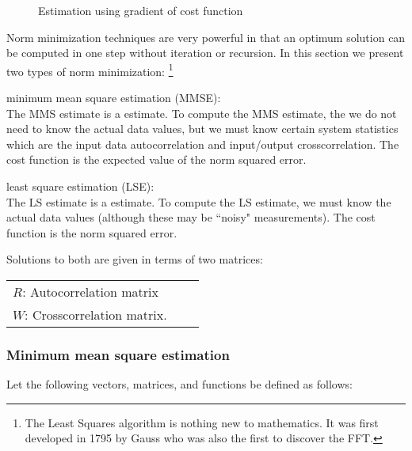 {\begin{figure}[ht]
\begin{center}
\begin{fsK}
\begin{picture}
\end{picture}
\end{fsK}
\end{center}
\caption{
   Estimation using gradient of cost function
   \label{fig:est-grad}
   }
\end{figure}




Norm minimization techniques are very powerful
in that an optimum solution can be computed
in one step without iteration or recursion.
In this section we present two types of norm minimization:
\footnote{
   The Least Squares algorithm is nothing new to mathematics.
   It was first developed in 1795 by Gauss who was also the first
   to discover the FFT.
   }

\begin{enume}
  \item minimum mean square estimation (MMSE): \\
        The MMS estimate is a  estimate.
        To compute the MMS estimate, the we do not need to know
        the actual data values, but we must know certain system statistics
        which are the
        input data autocorrelation and input/output crosscorrelation.
        The cost function is the expected value of the norm squared error.
   \item least square estimation (LSE): \\
        The LS estimate is a  estimate.
        To compute the LS estimate, we must know the actual data values
        (although these may be ``noisy" measurements).
        The cost function is the norm squared error.
\end{enume}

Solutions to both are given in terms of two matrices:

\begin{tabular}{lll}
   $R$: Autocorrelation matrix \\
   $W$: Crosscorrelation matrix.
\end{tabular}

\subsubsection{Minimum mean square estimation}
\label{sec:est_mms}
\begin{definition}
\label{def:est_matrices}
Let the following vectors, matrices, and functions
be defined as follows:


\end{definition}}
